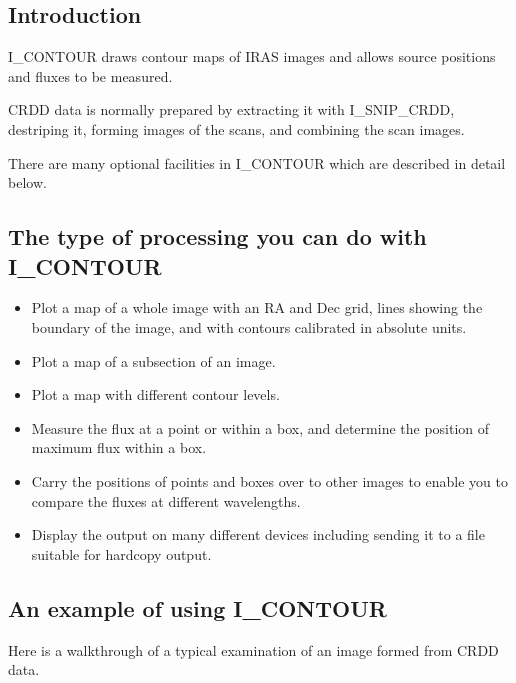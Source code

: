 \subsection {Introduction}

I\_CONTOUR draws contour maps of IRAS images and allows source positions and
fluxes to be measured.

CRDD data is normally prepared by extracting it with I\_SNIP\_CRDD, destriping
it, forming images of the scans, and combining the scan images.


There are many optional facilities in I\_CONTOUR which are described in detail
below.

\subsection{The type of processing you can do with I\_CONTOUR}

\begin{itemize}

\item Plot a map of a whole image with an RA and Dec grid, lines showing the
boundary of the image, and with contours calibrated in absolute units.

\item Plot a map of a subsection of an image.

\item Plot a map with different contour levels.

\item Measure the flux at a point or within a box, and determine the position of
maximum flux within a box.

\item Carry the positions of points and boxes over to other images to enable
you to compare the fluxes at different wavelengths.

\item Display the output on many different devices including sending it to a
file suitable for hardcopy output.
\end{itemize}

\subsection{An example of using I\_CONTOUR}

Here is a walkthrough of a typical examination of an image formed from CRDD
data.

